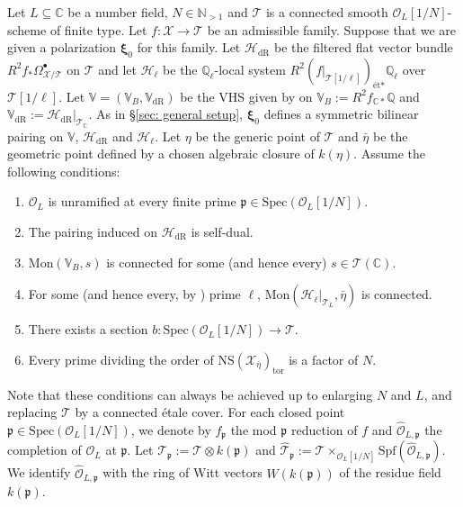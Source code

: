 \documentclass[letter, 11pt]{article}
\theoremstyle{plain}
\theoremstyle{definition}
\newcommand{\IC}{\mathbb{C}}
\newcommand{\IN}{\mathbb{N}}
\newcommand{\IQ}{\mathbb{Q}}
\newcommand{\IV}{\mathbb{V}}
\newcommand{\Spec}{\mathrm{Spec}}
\newcommand\tensor{{\otimes}}
\newcommand{\<}{\langle}
\renewcommand{\>}{\rangle}
\newcommand{\fp}{\mathfrak{p}}
\newcommand{\sH}{\mathcal{H}}
\newcommand{\sX}{\mathcal{X}}
\newcommand{\sT}{\mathcal{T}}
\newcommand{\sO}{\mathcal{O}}
\newcommand{\dR}{\mathrm{dR}}
\newcommand{\et}{\textrm{{\'e}t}}
\newcommand{\NS}{\mathrm{NS}}
\newcommand{\bxi}{\boldsymbol{\xi}}
\newcommand{\Mon}{\mathrm{Mon}}
\begin{document}
Let $L \subseteq \IC$ be a number field, $N \in \IN_{> 1}$ and $\sT$ is a connected smooth $\sO_L[1/N]$-scheme of finite type. Let $f : \sX \to \sT$ be an admissible family. Suppose that we are given a polarization $\bxi_0$ for this family. Let $\sH_\dR$ be the filtered flat vector bundle $R^2 f_* \Omega^\bullet_{\sX/\sT}$ on $\sT$ and let $\sH_\ell$ be the $\IQ_\ell$-local system $R^2 (f|_{\sT[1/\ell]})_{\et *} \IQ_\ell$ over $\sT[1/\ell]$. Let $\IV = (\IV_B, \IV_\dR)$ be the VHS given by on $\IV_B := R^2 f_{\IC *} \IQ$ and $\IV_\dR := \sH_\dR|_{\sT_\IC}$. As in \S\ref{sec: general setup}, $\bxi_0$ defines a symmetric bilinear pairing on $\IV$, $\sH_\dR$ and $\sH_\ell$. Let $\eta$ be the generic point of $\sT$ and $\bar{\eta}$ be the geometric point defined by a chosen algebraic closure of $k(\eta)$. Assume the following conditions: 

\begin{enumerate}[label=\upshape{(\roman*)}]
    \item $\sO_L$ is unramified at every finite prime $\fp \in \Spec(\sO_{L}[1/N])$.
    \item The pairing induced on $\sH_\dR$ is self-dual.
    \item $\mathrm{Mon}(\IV_B, s)$ is connected for some (and hence every) $s \in \sT(\IC)$. 
    \item For some (and hence every, by \cite[Prop.~6.14]{Larsen-Pink}) prime $\ell$, $\Mon(\sH_\ell|_{\sT_L}, \bar{\eta})$ is connected. 
    \item There exists a section $b : \Spec(\sO_L[1/N]) \to \sT$.
    \item Every prime dividing the order of $\NS(\sX_{\bar{\eta}})_{\mathrm{tor}}$ is a factor of $N$. 
\end{enumerate}
Note that these conditions can always be achieved up to enlarging $N$ and $L$, and replacing $\sT$ by a connected \'etale cover. For each closed point $\fp \in \Spec(\sO_L[1/N])$, we denote by $f_\fp$ the mod $\fp$ reduction of $f$ and $\hat{\sO}_{L, \fp}$ the completion of $\sO_L$ at $\fp$. Let $\sT_\fp := \sT \tensor k(\fp)$ and $\hat{\sT}_\fp := \sT \times_{\sO_{L}[1/N]} \mathrm{Spf}(\hat{\sO}_{L, \fp})$. We identify $\hat{\sO}_{L, \fp}$ with the ring of Witt vectors $W(k(\fp))$ of the residue field $k(\fp)$. 
\end{document}
